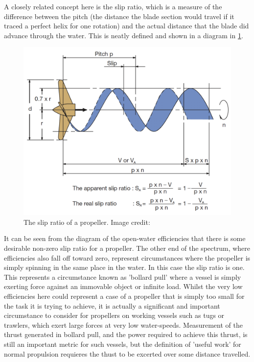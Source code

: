 \documentclass{article}\usepackage[]{graphicx}\usepackage[]{color}
\begin{document}
A closely related concept here is the slip ratio, which is a measure of the difference between the pitch (the distance the blade section would travel if it traced a perfect helix for one rotation) and the actual distance that the blade did advance through the water.  This is neatly defined and shown in a diagram in \ref{fig:SlipRatio.png}.

\begin{figure}
\includegraphics[width=\textwidth]{SlipRatio.png}
\caption{The slip ratio of a propeller. Image credit: \cite{MAN2017}}
\label{fig:SlipRatio.png}
\end{figure}

It can be seen from the diagram of the open-water efficiencies that there is some desirable non-zero slip ratio for a propeller.  The other end of the spectrum, where efficiencies also fall off toward zero, represent circumstances where the propeller is simply spinning in the same place in the water. In this case the slip ratio is one.  This represents a circumstance known as 'bollard pull' where a vessel is simply exerting force against an immovable object or infinite load.  Whilst the very low efficiencies here could represent a case of a propeller that is simply too small for the task it is trying to achieve, it is actually a significant and important circumstance to consider for propellers on working vessels such as tugs or trawlers, which exert large forces at very low water-speeds.  Measurement of the thrust generated in bollard pull, and the power required to achieve this thrust, is still an important metric for such vessels, but the definition of 'useful work' for normal propulsion requieres the thust to be excerted over some distance travelled.
\end{document}
